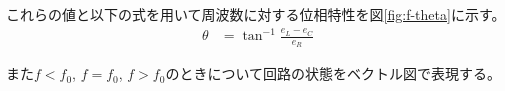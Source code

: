 \documentclass[11pt,a4paper,fleqn]{jsarticle}
\begin{document}
\begin{figure}[H]
\end{figure}

これらの値と以下の式を用いて周波数に対する位相特性を図\ref{fig:f-theta}に示す。
\begin{align}
\theta&=\tan^{-1}\frac{e_{L}-e_{C}}{e_{R}}
\end{align}

\begin{figure}[H]
\end{figure}

また$f<f_{0}$, $f=f_{0}$, $f>f_{0}$のときについて回路の状態をベクトル図で表現する。
\end{document}

